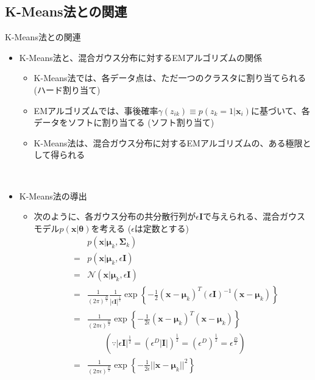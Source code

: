 \documentclass[dvipdfmx,notheorems,t]{beamer}
\begin{document}
\subsection{K-Means法との関連}

\begin{frame}{K-Means法との関連}

\begin{itemize}
	\item K-Means法と、混合ガウス分布に対するEMアルゴリズムの関係
	\begin{itemize}
		\item K-Means法では、各データ点は、ただ一つのクラスタに割り当てられる (\alert{ハード割り当て})
		\item EMアルゴリズムでは、事後確率$\gamma(z_{ik}) \equiv p(z_k = 1 | \bm{x}_i)$に基づいて、各データをソフトに割り当てる (\alert{ソフト割り当て})
		\newline
		\item K-Means法は、混合ガウス分布に対するEMアルゴリズムの、\alert{ある極限として得られる}
	\end{itemize} \
	
	\framebreak
	
	\item K-Means法の導出
	\begin{itemize}
		\item 次のように、各ガウス分布の共分散行列が$\epsilon \bm{I}$で与えられる、混合ガウスモデル$p(\bm{x} | \bm{\theta})$を考える ($\epsilon$は定数とする)
		\begin{eqnarray}
			&& p(\bm{x} | \bm{\mu}_k, \bm{\Sigma}_k) \nonumber \\
			&=& p(\bm{x} | \bm{\mu}_k, \epsilon \bm{I}) \nonumber \\
			&=& \mathcal{N}(\bm{x} | \bm{\mu}_k, \epsilon \bm{I}) \nonumber \\
			&=& \frac{1}{(2\pi)^\frac{D}{2}} \frac{1}{|\epsilon \bm{I}|^\frac{1}{2}} \exp \left\{ -\frac{1}{2} (\bm{x} - \bm{\mu}_k)^T (\epsilon \bm{I})^{-1} (\bm{x} - \bm{\mu}_k) \right\} \\
			&=& \frac{1}{(2\pi \epsilon)^\frac{D}{2}} \exp \left\{ -\frac{1}{2\epsilon} (\bm{x} - \bm{\mu}_k)^T (\bm{x} - \bm{\mu}_k) \right\} \\
			&& \qquad (\because |\epsilon \bm{I}|^\frac{1}{2} = \left( \epsilon^D |\bm{I}| \right)^\frac{1}{2} = \left( \epsilon^D \right)^\frac{1}{2} = \epsilon^\frac{D}{2}) \nonumber \\
			&=& \frac{1}{(2\pi \epsilon)^\frac{D}{2}} \exp \left\{ -\frac{1}{2\epsilon} || \bm{x} - \bm{\mu}_k ||^2 \right\}
		\end{eqnarray}
		

\end{itemize}
\end{itemize}
\end{frame}
\end{document}
